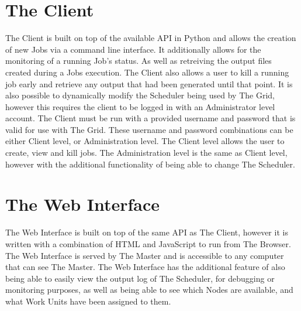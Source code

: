 \section{The Client}
The Client is built on top of the available API in Python and allows the creation of new Jobs via a command line interface. It additionally allows for the monitoring of a running Job's status. As well as retreiving the output files created during a Jobs execution. The Client also allows a user to kill a running job early and retrieve any output that had been generated until that point. It is also possible to dynamically modify the Scheduler being used by The Grid, however this requires the client to be logged in with an Administrator level account. The Client must be run with a provided username and password that is valid for use with The Grid. These username and password combinations can be either Client level, or Administration level. The Client level allows the user to create, view and kill jobs. The Administration level is the same as Client level, however with the additional functionality of being able to change The Scheduler.

\section{The Web Interface}
The Web Interface is built on top of the same API as The Client, however it is written with a combination of HTML and JavaScript to run from The Browser. The Web Interface is served by The Master and is accessible to any computer that can see The Master. The Web Interface has the additional feature of also being able to easily view the output log of The Scheduler, for debugging or monitoring purposes, as well as being able to see which Nodes are available, and what Work Units have been assigned to them.



